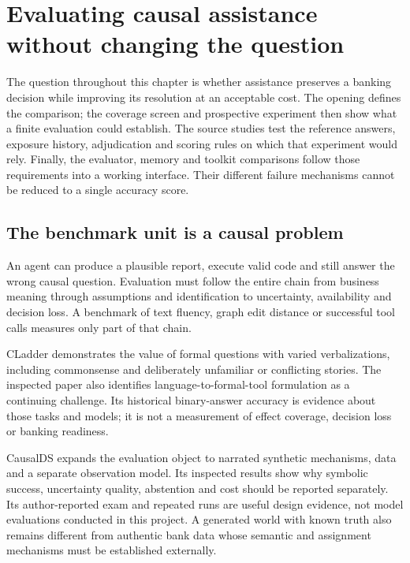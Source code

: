 \chapter{Evaluating causal assistance without changing the question}
\label{la:evaluation}

The question throughout this chapter is whether assistance preserves a banking decision while improving its resolution at an acceptable cost. The opening defines the comparison; the coverage screen and prospective experiment then show what a finite evaluation could establish. The source studies test the reference answers, exposure history, adjudication and scoring rules on which that experiment would rely. Finally, the evaluator, memory and toolkit comparisons follow those requirements into a working interface. Their different failure mechanisms cannot be reduced to a single accuracy score.

\section{The benchmark unit is a causal problem}

An agent can produce a plausible report, execute valid code and still answer
the wrong causal question. Evaluation must follow the entire chain from
business meaning through assumptions and identification to uncertainty,
availability and decision loss. A benchmark of text fluency, graph edit
distance or successful tool calls measures only part of that chain.

CLadder demonstrates the value of formal questions with varied verbalizations,
including commonsense and deliberately unfamiliar or conflicting stories.
The inspected paper also identifies language-to-formal-tool formulation as
a continuing challenge. Its historical binary-answer accuracy is evidence
about those tasks and models; it is not a measurement of effect coverage,
decision loss or banking readiness. \cite{v12_la_2312_04350}

CausalDS expands the evaluation object to narrated synthetic mechanisms,
data and a separate observation model. Its inspected results show why
symbolic success, uncertainty quality, abstention and cost should be reported
separately. Its author-reported exam and repeated runs are useful design
evidence, not model evaluations conducted in this project. A generated world
with known truth also remains different from authentic bank data whose
semantic and assignment mechanisms must be established externally.
\cite{v12_la_2607_08093}

